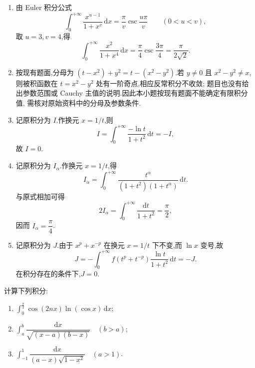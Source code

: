 \begin{solution}
  \begin{enumerate}
    \item 由 Euler 积分公式
          \[
            \int_0^{+\infty}\dfrac{x^{u-1}}{1+x^v}\,\mathrm{d}x
            =\dfrac{\pi}{v}\csc\dfrac{u\pi}{v}
            \qquad(0<u<v),
          \]
          取 $u=3,v=4$,得
          \[
            \int_0^{+\infty}\dfrac{x^2}{1+x^4}\,\mathrm{d}x
            =\dfrac{\pi}{4}\csc\dfrac{3\pi}{4}
            =\dfrac{\pi}{2\sqrt{2}}.
          \]

    \item 按现有题面,分母为 $(t-x^2)+y^2=t-(x^2-y^2)$.若 $y\neq0$ 且
          $x^2-y^2\neq x$,则被积函数在 $t=x^2-y^2$ 处有一阶奇点,相应反常积分不收敛;
          题目也没有给出参数范围或 Cauchy 主值的说明.因此本小题按现有题面不能确定有限积分值,
          需核对原始资料中的分母及参数条件.

    \item 记原积分为 $I$.作换元 $x=1/t$,则
          \[
            I=\int_0^{+\infty}\dfrac{-\ln t}{1+t^2}\,\mathrm{d}t=-I,
          \]
          故 $I=0$.

    \item 记原积分为 $I_\alpha$.作换元 $x=1/t$,得
          \[
            I_\alpha
            =\int_0^{+\infty}\dfrac{t^\alpha}{(1+t^2)(1+t^\alpha)}\,\mathrm{d}t.
          \]
          与原式相加可得
          \[
            2I_\alpha=\int_0^{+\infty}\dfrac{\mathrm{d}t}{1+t^2}=\dfrac{\pi}{2},
          \]
          因而 $I_\alpha=\dfrac{\pi}{4}$.

    \item 记原积分为 $J$.由于 $x^p+x^{-p}$ 在换元 $x=1/t$ 下不变,而
          $\ln x$ 变号,故
          \[
            J=-\int_0^{+\infty}f(t^p+t^{-p})\dfrac{\ln t}{1+t^2}\,\mathrm{d}t=-J.
          \]
          在积分存在的条件下,$J=0$.
  \end{enumerate}
\end{solution}

\begin{example}
  计算下列积分:
  \begin{enumerate}
    \item $\displaystyle\int_0^{\frac{\pi}{2}}\cos(2nx)\ln(\cos x)\,\mathrm{d}x$;
    \item $\displaystyle\int_a^b\dfrac{\mathrm{d}x}{\sqrt{(x-a)(b-x)}}\quad(b>a)$;
    \item $\displaystyle\int_{-1}^{1}\dfrac{\mathrm{d}x}{(a-x)\sqrt{1-x^2}}\quad(a>1)$.
  \end{enumerate}
\end{example}
\exampleblank

